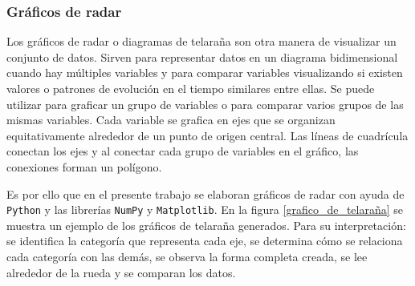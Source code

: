 
\subsubsection{Gráficos de radar}
Los gráficos de radar o diagramas de telaraña son otra manera de visualizar un conjunto de datos. Sirven para representar datos en un diagrama bidimensional cuando hay múltiples variables y para comparar variables visualizando si existen valores o patrones de evolución en el tiempo similares entre ellas. Se puede utilizar para graficar un grupo de variables o para comparar varios grupos de las mismas variables. Cada variable se grafica en ejes que se organizan equitativamente alrededor de un punto de origen central. Las líneas de cuadrícula conectan los ejes y al conectar cada grupo de variables en el gráfico, las conexiones forman un polígono.

Es por ello que en el presente trabajo se elaboran gráficos de radar con ayuda de \texttt{Python} y las librerías \texttt{NumPy} y \texttt{Matplotlib}. En la figura \ref{grafico_de_telaraña} se muestra un ejemplo de los gráficos de telaraña generados. Para su interpretación: se identifica la categoría que representa cada eje, se determina cómo se relaciona cada categoría con las demás, se observa la forma completa creada, se lee alrededor de la rueda y se comparan los datos.

